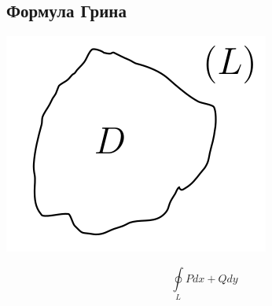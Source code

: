 \documentclass[12pt]{article}
\let\ORIincludegraphics\includegraphics
\renewcommand{\includegraphics}[2][]{\ORIincludegraphics[scale=0.65,#1]{#2}}
\let\oldoint\oint
\renewcommand{\oint}{\oldoint\limits}
\begin{document}
  \subsection{Формула Грина}
  \begin{minipage}{0.45\textwidth}
    \includegraphics[scale=1]{8.15.1.png}
  \end{minipage}
  \hspace{1em}
  \begin{minipage}{0.55\textwidth}
    \[\oint_{L}Pdx+Qdy\]
  \end{minipage}
  \vspace{1em}
  \par
\end{document}
